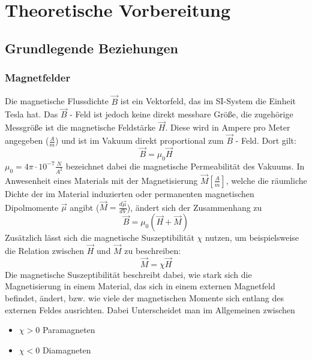 \section{Theoretische Vorbereitung}
    \subsection{Grundlegende Beziehungen}
        \subsubsection{Magnetfelder}
            Die magnetische Flussdichte $\vec{B}$ ist ein Vektorfeld, das im SI-System die Einheit Tesla hat.
            Das $\vec{B}$ - Feld ist jedoch keine direkt messbare Größe, die zugehörige Messgröße ist die magnetische Feldstärke $\vec{H}$.
            Diese wird in Ampere pro Meter angegeben ($\frac{A}{m}$) und ist im Vakuum direkt proportional
            zum $\vec{B}$ - Feld. Dort gilt:
            \begin{equation}
                \vec{B} = \mu_0 \vec{H}
            \end{equation}
            $\mu_0 = 4\pi \cdot 10^{-7}\frac{N}{A^2}$ bezeichnet dabei die magnetische Permeabilität des Vakuums.
            In Anwesenheit eines Materials mit der Magnetisierung $\vec{M} [\frac{A}{m}]$, welche die räumliche Dichte der im Material induzierten oder permanenten magnetischen Dipolmomente $\vec{\mu}$ angibt ($\vec{M} = \frac{d\vec{\mu}}{dV}$), ändert sich der Zusammenhang zu
            \begin{equation}
                \vec{B} = \mu_0 (\vec{H} + \vec{M})
            \end{equation}
            Zusätzlich lässt sich die magnetische Suszeptibilität $\chi$ nutzen, um beispielsweise die Relation zwischen $\vec{H}$ und $\vec{M}$ zu beschreiben:
            \begin{equation}
                \vec{M} = \chi \vec{H}
            \end{equation}
            Die magnetische Suszeptibilität beschreibt dabei, wie stark sich die Magnetisierung in einem
            Material, das sich in einem externen Magnetfeld befindet, ändert, bzw. wie viele der magnetischen Momente sich entlang des externen Feldes ausrichten.
            Dabei Unterscheidet man im Allgemeinen zwischen
            \begin{itemize}
                \item $\chi > 0$ Paramagneten
                \item $\chi < 0$ Diamagneten
            \end{itemize}
